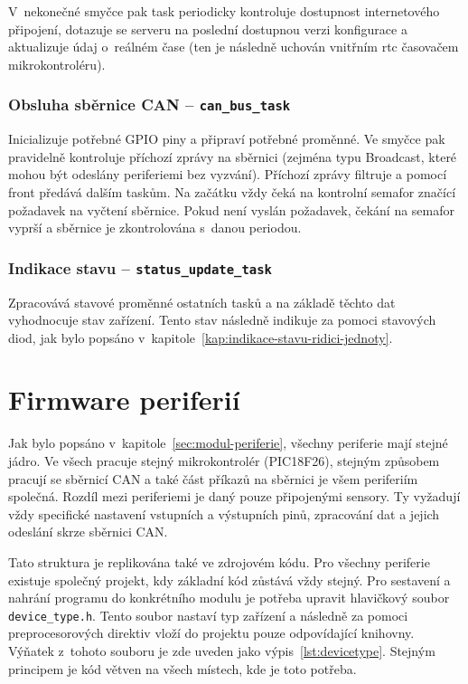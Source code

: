             V~nekonečné smyčce pak task periodicky kontroluje dostupnost internetového připojení, dotazuje se serveru na poslední dostupnou verzi konfigurace a aktualizuje údaj o~reálném čase (ten je následně uchován vnitřním \acs{rtc} časovačem mikrokontroléru).

        \subsubsection{Obsluha sběrnice CAN --  \texttt{can\_bus\_task}}
            Inicializuje potřebné GPIO piny a připraví potřebné proměnné. Ve smyčce pak pravidelně kontroluje příchozí zprávy na sběrnici (zejména typu Broadcast, které mohou být odeslány periferiemi bez vyzvání). Příchozí zprávy filtruje a pomocí front předává dalším taskům. Na začátku vždy čeká na kontrolní semafor značící požadavek na vyčtení sběrnice. Pokud není vyslán požadavek, čekání na semafor vyprší a sběrnice je zkontrolována s~danou periodou.

        \subsubsection{Indikace stavu --  \texttt{status\_update\_task}}
            Zpracovává stavové proměnné ostatních tasků a na základě těchto dat vyhodnocuje stav zařízení. Tento stav následně indikuje za pomoci stavových diod, jak bylo popsáno v~kapitole~\ref{kap:indikace-stavu-ridici-jednoty}.



\section{Firmware periferií}
    Jak bylo popsáno v~kapitole~\ref{sec:modul-periferie}, všechny periferie mají stejné jádro. Ve všech pracuje stejný mikrokontrolér (PIC18F26), stejným způsobem pracují se sběrnicí CAN a také část příkazů na sběrnici je všem periferiím společná. Rozdíl mezi periferiemi je daný pouze připojenými sensory. Ty vyžadují vždy specifické nastavení vstupních a výstupních pinů, zpracování dat a jejich odeslání skrze sběrnici CAN. 

    Tato struktura je replikována také ve zdrojovém kódu. Pro všechny periferie existuje společný projekt, kdy základní kód zůstává vždy stejný. Pro sestavení a nahrání programu do konkrétního modulu je potřeba upravit hlavičkový soubor \texttt{device\_type.h}. Tento soubor nastaví typ zařízení a následně za pomoci preprocesorových direktiv vloží do projektu pouze odpovídající knihovny. Výňatek z~tohoto souboru je zde uveden jako výpis~\ref{lst:devicetype}. Stejným principem je kód větven na všech místech, kde je toto potřeba. 

